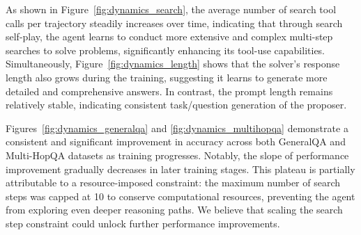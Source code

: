 \documentclass[10pt, a4paper, logo]{googledeepmind} %
\begin{document}
As shown in Figure~\ref{fig:dynamics_search}, the average number of search tool calls per trajectory steadily increases over time, indicating that through search self-play, the agent learns to conduct more extensive and complex multi-step searches to solve problems, significantly enhancing its tool-use capabilities. Simultaneously, Figure~\ref{fig:dynamics_length} shows that the solver's response length also grows during the training, suggesting it learns to generate more detailed and comprehensive answers. In contrast, the prompt length remains relatively stable, indicating consistent task/question generation of the proposer.

Figures~\ref{fig:dynamics_generalqa} and \ref{fig:dynamics_multihopqa} demonstrate a consistent and significant improvement in accuracy across both GeneralQA and Multi-HopQA datasets as training progresses. Notably, the slope of performance improvement gradually decreases in later training stages. This plateau is partially attributable to a resource-imposed constraint: the maximum number of search steps was capped at 10 to conserve computational resources, preventing the agent from exploring even deeper reasoning paths. We believe that scaling the search step constraint could unlock further performance improvements.
\end{document}
